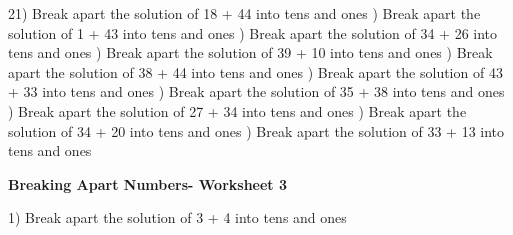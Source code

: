 \documentclass{article}%
\begin{document}
21) Break apart the solution of 18 + 44 into tens and ones%
\newline%
\newline%
) Break apart the solution of 1 + 43 into tens and ones%
\newline%
\newline%
) Break apart the solution of 34 + 26 into tens and ones%
\newline%
\newline%
) Break apart the solution of 39 + 10 into tens and ones%
\newline%
\newline%
) Break apart the solution of 38 + 44 into tens and ones%
\newline%
\newline%
) Break apart the solution of 43 + 33 into tens and ones%
\newline%
\newline%
) Break apart the solution of 35 + 38 into tens and ones%
\newline%
\newline%
) Break apart the solution of 27 + 34 into tens and ones%
\newline%
\newline%
) Break apart the solution of 34 + 20 into tens and ones%
\newline%
\newline%
) Break apart the solution of 33 + 13 into tens and ones%
\newline%
\newline%
\newline%
\pagebreak%
\large%
\begin{center}%
\textbf{Breaking Apart Numbers- Worksheet 3}%
\newline%
\newline%
\newline%
\end{center} \normalsize%
1) Break apart the solution of 3 + 4 into tens and ones%
\newline%
\newline%
\newline%
\end{document}
